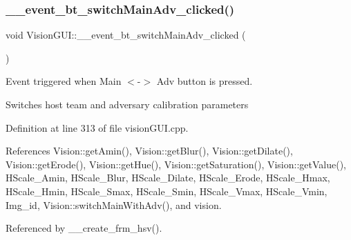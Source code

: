 \subsubsection{\texorpdfstring{\+\_\+\+\_\+event\+\_\+bt\+\_\+switch\+Main\+Adv\+\_\+clicked()}{\_\_event\_bt\_switchMainAdv\_clicked()}}
{\footnotesize\ttfamily void Vision\+G\+U\+I\+::\+\_\+\+\_\+event\+\_\+bt\+\_\+switch\+Main\+Adv\+\_\+clicked (\begin{DoxyParamCaption}{ }\end{DoxyParamCaption})\hspace{0.3cm}{\ttfamily [private]}}



Event triggered when \textquotesingle{}Main $<$-\/$>$ Adv\textquotesingle{} button is pressed. 

Switches host team and adversary calibration parameters 

Definition at line 313 of file vision\+G\+U\+I.\+cpp.



References Vision\+::get\+Amin(), Vision\+::get\+Blur(), Vision\+::get\+Dilate(), Vision\+::get\+Erode(), Vision\+::get\+Hue(), Vision\+::get\+Saturation(), Vision\+::get\+Value(), H\+Scale\+\_\+\+Amin, H\+Scale\+\_\+\+Blur, H\+Scale\+\_\+\+Dilate, H\+Scale\+\_\+\+Erode, H\+Scale\+\_\+\+Hmax, H\+Scale\+\_\+\+Hmin, H\+Scale\+\_\+\+Smax, H\+Scale\+\_\+\+Smin, H\+Scale\+\_\+\+Vmax, H\+Scale\+\_\+\+Vmin, Img\+\_\+id, Vision\+::switch\+Main\+With\+Adv(), and vision.



Referenced by \+\_\+\+\_\+create\+\_\+frm\+\_\+hsv().


